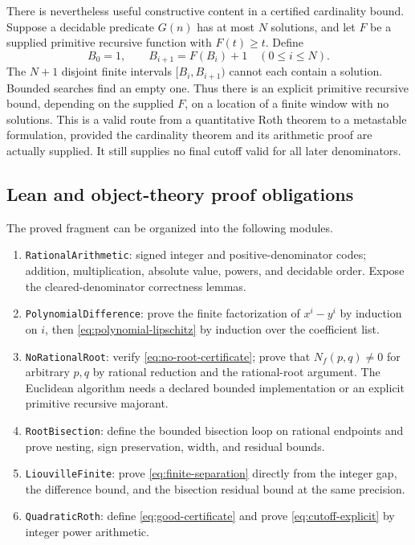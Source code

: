 There is nevertheless useful constructive content in a certified
cardinality bound.  Suppose a decidable predicate $G(n)$ has at most $N$
solutions, and let $F$ be a supplied primitive recursive function with
$F(t)\geq t$.  Define
\[
 B_0=1,\qquad B_{i+1}=F(B_i)+1\quad(0\leq i\leq N).
\]
The $N+1$ disjoint finite intervals $[B_i,B_{i+1})$ cannot each contain a
solution.  Bounded searches find an empty one.  Thus there is an explicit
primitive recursive bound, depending on the supplied $F$, on a location of
a finite window with no solutions.  This is a valid route from a
quantitative Roth theorem to a metastable formulation, provided the
cardinality theorem and its arithmetic proof are actually supplied.
It still supplies no final cutoff valid for all later denominators.

\subsection{Lean and object-theory proof obligations}

The proved fragment can be organized into the following modules.
\begin{enumerate}
\item \texttt{RationalArithmetic}: signed integer and positive-denominator
codes; addition, multiplication, absolute value, powers, and decidable order.
Expose the cleared-denominator correctness lemmas.
\item \texttt{PolynomialDifference}: prove the finite factorization of
$x^i-y^i$ by induction on $i$, then
\eqref{eq:polynomial-lipschitz} by induction over the coefficient list.
\item \texttt{NoRationalRoot}: verify \eqref{eq:no-root-certificate}; prove
that $N_f(p,q)\ne0$ for arbitrary $p,q$ by rational reduction and the
rational-root argument.  The Euclidean algorithm needs a declared bounded
implementation or an explicit primitive recursive majorant.
\item \texttt{RootBisection}: define the bounded bisection loop on rational
endpoints and prove nesting, sign preservation, width, and residual bounds.
\item \texttt{LiouvilleFinite}: prove \eqref{eq:finite-separation} directly from the integer gap,
the difference bound, and the bisection residual bound at the same precision.
\item \texttt{QuadraticRoth}: define \eqref{eq:good-certificate} and prove
\eqref{eq:cutoff-explicit} by integer power arithmetic.
\end{enumerate}

